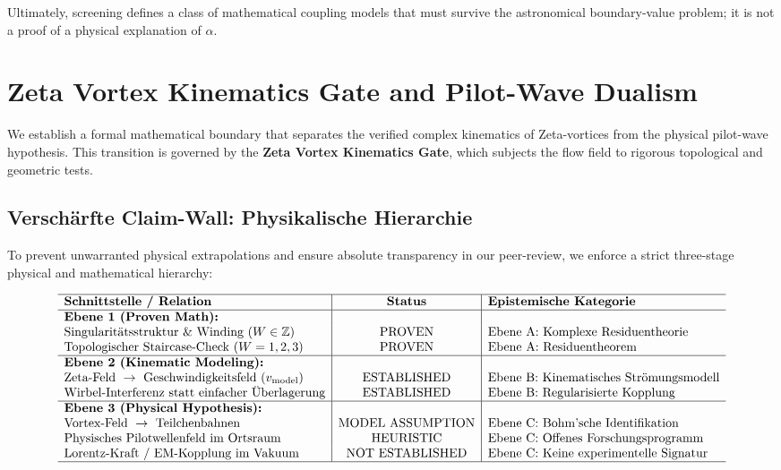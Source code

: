 \documentclass[11pt,a4paper]{article}
\theoremstyle{definition}
\begin{document}
	Ultimately, screening defines a class of mathematical coupling models that must survive the astronomical boundary-value problem; it is not a proof of a physical explanation of $\alpha$.
	
	\section{Zeta Vortex Kinematics Gate and Pilot-Wave Dualism}
	\label{sec:zeta_vortex_kinematics_gate}
	
	We establish a formal mathematical boundary that separates the verified complex kinematics of Zeta-vortices from the physical pilot-wave hypothesis. This transition is governed by the \textbf{Zeta Vortex Kinematics Gate}, which subjects the flow field to rigorous topological and geometric tests.
	
	\subsection{Verschärfte Claim-Wall: Physikalische Hierarchie}
	To prevent unwarranted physical extrapolations and ensure absolute transparency in our peer-review, we enforce a strict three-stage physical and mathematical hierarchy:
	
	\begin{equation}
		\begin{array}{l|c|l}
			\hline
			\textbf{Schnittstelle / Relation} & \textbf{Status} & \textbf{Epistemische Kategorie} \\
			\hline
			\text{\textbf{Ebene 1 (Proven Math):}} & & \\
			\text{Singularit\"{a}tsstruktur \& Winding } (W \in \mathbb{Z}) & \text{PROVEN} & \text{Ebene A: Komplexe Residuentheorie} \\
			\text{Topologischer Staircase-Check } (W = 1, 2, 3) & \text{PROVEN} & \text{Ebene A: Residuentheorem} \\
			\hline
			\text{\textbf{Ebene 2 (Kinematic Modeling):}} & & \\
			\text{Zeta-Feld } \to \text{ Geschwindigkeitsfeld } (v_{\rm model}) & \text{ESTABLISHED} & \text{Ebene B: Kinematisches Str\"{o}mungsmodell} \\
			\text{Wirbel-Interferenz statt einfacher \"{U}berlagerung} & \text{ESTABLISHED} & \text{Ebene B: Regularisierte Kopplung} \\
			\hline
			\text{\textbf{Ebene 3 (Physical Hypothesis):}} & & \\
			\text{Vortex-Feld } \to \text{ Teilchenbahnen} & \text{MODEL ASSUMPTION} & \text{Ebene C: Bohm'sche Identifikation} \\
			\text{Physisches Pilotwellenfeld im Ortsraum} & \text{HEURISTIC} & \text{Ebene C: Offenes Forschungsprogramm} \\
			\text{Lorentz-Kraft / EM-Kopplung im Vakuum} & \text{NOT ESTABLISHED} & \text{Ebene C: Keine experimentelle Signatur} \\
			\hline
		\end{array}
	\end{equation}
	
\end{document}
